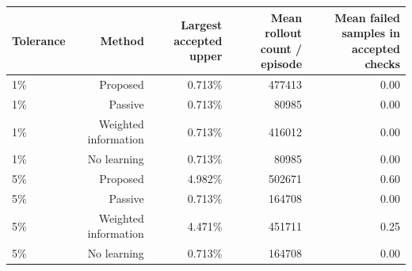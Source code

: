\begin{tabular}{lrrrr}
\toprule
Tolerance & Method & Largest accepted upper & Mean rollout count / episode & Mean failed samples in accepted checks \\
\midrule
1\% & Proposed & 0.713\% & 477413 & 0.00 \\
1\% & Passive & 0.713\% & 80985 & 0.00 \\
1\% & Weighted information & 0.713\% & 416012 & 0.00 \\
1\% & No learning & 0.713\% & 80985 & 0.00 \\
5\% & Proposed & 4.982\% & 502671 & 0.60 \\
5\% & Passive & 0.713\% & 164708 & 0.00 \\
5\% & Weighted information & 4.471\% & 451711 & 0.25 \\
5\% & No learning & 0.713\% & 164708 & 0.00 \\
\bottomrule
\end{tabular}
